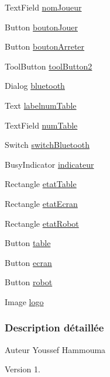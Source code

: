 \begin{DoxyCompactItemize}
\item 
Text\+Field \hyperlink{class_fenetre_accueil_a79540e2e1ddf30c552a18827d399aaa5}{nom\+Joueur}
\item 
Button \hyperlink{class_fenetre_accueil_ac5e80ac1034ffc5983cd872836f9bb58}{bouton\+Jouer}
\item 
Button \hyperlink{class_fenetre_accueil_a636b3afbcc6974bc4a40cc56aaf4e771}{bouton\+Arreter}
\item 
Tool\+Button \hyperlink{class_fenetre_accueil_aa418487ce174f7b63b719d5971c75cc1}{tool\+Button2}
\item 
Dialog \hyperlink{class_fenetre_accueil_a323bda5e05c6dde96cb49f1de810750b}{bluetooth}
\item 
Text \hyperlink{class_fenetre_accueil_a049625a0c3cdca775c1ae647b7b91336}{labelnum\+Table}
\item 
Text\+Field \hyperlink{class_fenetre_accueil_a01fbf19535ae41e1a5326c7cc6d1ef20}{num\+Table}
\item 
Switch \hyperlink{class_fenetre_accueil_aed0d52accd95adf14ce87f2957caf0b1}{switch\+Bluetooth}
\item 
Busy\+Indicator \hyperlink{class_fenetre_accueil_a567e1d608934d1bea395783a6c3b17fc}{indicateur}
\item 
Rectangle \hyperlink{class_fenetre_accueil_a0c8ee4c83d441bb05e14d723224883ee}{etat\+Table}
\item 
Rectangle \hyperlink{class_fenetre_accueil_aeb945de780462ac93bad0f3bc982cdca}{etat\+Ecran}
\item 
Rectangle \hyperlink{class_fenetre_accueil_af5e778c00083e860edf0a5adaef5df90}{etat\+Robot}
\item 
Button \hyperlink{class_fenetre_accueil_a3cb2c13c392a9802a3d2f4fdd0df86f0}{table}
\item 
Button \hyperlink{class_fenetre_accueil_ad78791c77103b9e216e89bd8091d1bcb}{ecran}
\item 
Button \hyperlink{class_fenetre_accueil_a1a313e34caaa07f73342c4edb92030b7}{robot}
\item 
Image \hyperlink{class_fenetre_accueil_a20e8a6f25dc550d91b67309f92f2ea7a}{logo}
\end{DoxyCompactItemize}


\subsubsection{Description détaillée}
\begin{DoxyAuthor}{Auteur}
Youssef Hammouma
\end{DoxyAuthor}
\begin{DoxyVersion}{Version}
1. 
\end{DoxyVersion}


